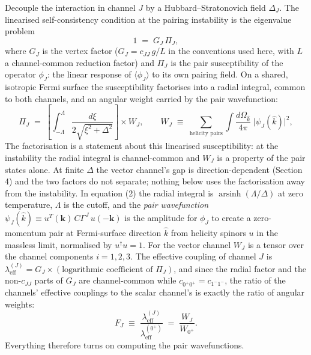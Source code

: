 \documentclass[11pt]{article}
\begin{document}
Decouple the interaction in channel $J$ by a Hubbard--Stratonovich field $\Delta_J$. The linearised self-consistency condition at the pairing instability is the eigenvalue problem
\begin{equation}
1 \;=\; G_J \, \Pi_J,
\end{equation}
where $G_J$ is the vertex factor ($G_J = c_{JJ}\, g / L$ in the conventions used here, with $L$ a channel-common reduction factor) and $\Pi_J$ is the pair susceptibility of the operator $\phi_J$: the linear response of $\langle \phi_J \rangle$ to its own pairing field. On a shared, isotropic Fermi surface the susceptibility factorises into a radial integral, common to both channels, and an angular weight carried by the pair wavefunction:
\begin{equation}
\Pi_J \;=\; \left[ \int_{-\Lambda}^{\Lambda} \frac{d\xi}{2\sqrt{\xi^2 + \Delta^2}} \right] \times W_J,
\qquad
W_J \;\equiv\; \sum_{\text{helicity pairs}} \int \frac{d\Omega_{\hat k}}{4\pi}\; \big| \psi_J(\hat k) \big|^2,
\end{equation}
The factorisation is a statement about this linearised susceptibility: at the instability the radial integral is channel-common and $W_J$ is a property of the pair states alone. At finite $\Delta$ the vector channel's gap is direction-dependent (Section 4) and the two factors do not separate; nothing below uses the factorisation away from the instability. In equation (2) the radial integral is $\operatorname{arsinh}(\Lambda/\Delta)$ at zero temperature, $\Lambda$ is the cutoff, and the \emph{pair wavefunction} $\psi_J(\hat k) \equiv u^T(\mathbf{k})\, C \Gamma^J\, u(-\mathbf{k})$ is the amplitude for $\phi_J$ to create a zero-momentum pair at Fermi-surface direction $\hat k$ from helicity spinors $u$ in the massless limit, normalised by $u^\dagger u = 1$. For the vector channel $W_J$ is a tensor over the channel components $i = 1,2,3$. The effective coupling of channel $J$ is $\lambda_{\mathrm{eff}}^{(J)} = G_J \times (\text{logarithmic coefficient of } \Pi_J)$, and since the radial factor and the non-$c_{JJ}$ parts of $G_J$ are channel-common while $c_{0^+0^+} = c_{1^-1^-}$, the ratio of the channels' effective couplings to the scalar channel's is exactly the ratio of angular weights:
\begin{equation}
F_J \;\equiv\; \frac{\lambda_{\mathrm{eff}}^{(J)}}{\lambda_{\mathrm{eff}}^{(0^+)}} \;=\; \frac{W_J}{W_{0^+}}.
\end{equation}
Everything therefore turns on computing the pair wavefunctions.
\end{document}
